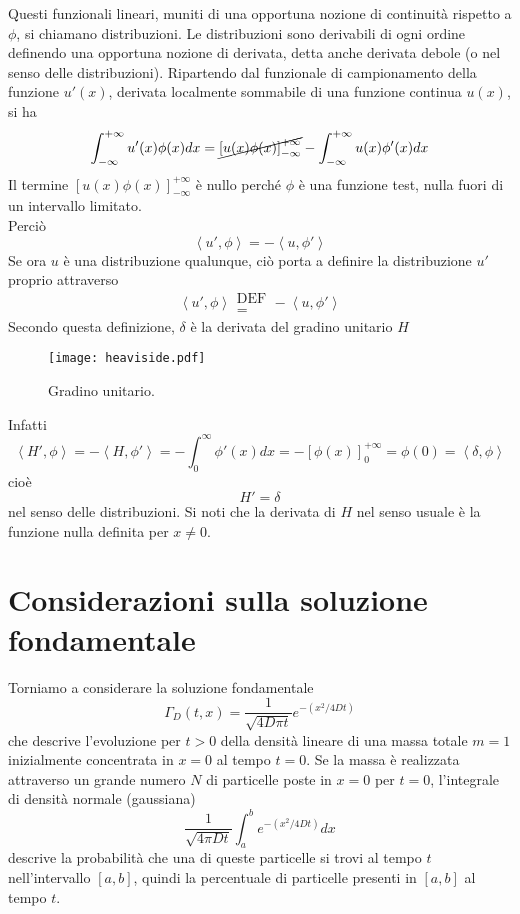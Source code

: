 Questi funzionali lineari, muniti di una opportuna nozione di continuit\`a
rispetto a $\phi$, si chiamano distribuzioni. Le distribuzioni sono
derivabili di ogni ordine definendo una opportuna nozione di derivata,
detta anche derivata debole (o nel senso delle distribuzioni).
Ripartendo dal funzionale di campionamento della funzione $u'(x)$, derivata
localmente sommabile di una funzione continua $u(x)$, si ha
\[
	\int_{- \infty}^{+ \infty} u'(x)\phi(x) dx= \cancel{\left[ u(x)\phi(x) \right]^
	{+\infty}_{-\infty}}- \int_{- \infty}^{+ \infty} u(x)\phi ' (x) dx
\]
Il termine $\left[ u(x)\phi(x) \right]^{+\infty}_{-\infty}$ \`e nullo perch\'e
$\phi$ \`e una funzione test, nulla fuori di un intervallo limitato.\\
Perci\`o
\[
	\left< u', \phi \right>= - \left< u, \phi ' \right>
\]
Se ora $u$ \`e una distribuzione qualunque, ci\`o porta a definire la
distribuzione $u'$ proprio attraverso
\[
	\left< u', \phi \right>\substack{\text{DEF} \\ =} - \left< u, \phi ' \right>
\]
Secondo questa definizione, $\delta$ \`e la derivata del gradino unitario $H$
\begin{figure}[H]
	\centering
	\texttt{[image: heaviside.pdf]}
	\caption{Gradino unitario.}
	\label{heaviside}
\end{figure}
\noindent
Infatti
\[
	\left< H', \phi \right>= - \left< H, \phi ' \right>
	=- \int_0^{\infty} \phi'(x) dx
	=- \left[ \phi (x) \right]^{+ \infty}_{0}
	= \phi(0)= \left< \delta, \phi \right>
\]
cio\`e
\[
	H'=\delta
\]
nel senso delle distribuzioni.
Si noti che la derivata di $H$ nel senso usuale \`e la funzione nulla definita
per $x \neq 0$.
\section{Considerazioni sulla soluzione fondamentale}
Torniamo a considerare la soluzione fondamentale
\[
	\Gamma_D(t,x)= \frac{1}{\sqrt{4D\pi t}}
	e^{-\left( x^2/4Dt \right)}
\]
che descrive l'evoluzione per $t>0$ della densit\`a lineare di una massa totale
$m=1$ inizialmente concentrata in $x=0$ al tempo $t=0$. 
Se la massa \`e realizzata attraverso un grande numero $N$ di particelle poste in $x=0$ per $t=0$, l'integrale di densit\`a normale (gaussiana)
\[
	\frac{1}{\sqrt{4 \pi D t}}\int_a^b 
	e^{-\left( x^2/4Dt \right)} dx
\]
descrive la probabilit\`a che una di queste particelle si trovi al tempo $t$
nell'intervallo $[a,b]$, quindi la percentuale di particelle presenti in $[a,b]$
al tempo $t$.

